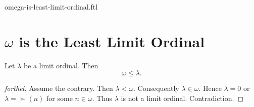 \documentclass{naproche-library}
\begin{document}
\begin{smodule}{omega-is-least-limit-ordinal.ftl}

  \section*{$\omega$ is the Least Limit Ordinal}

  \begin{proposition}[forthel,id=SET_THEORY_03_5517271459954688,printid]
    Let $\lambda$ be a limit ordinal.
    Then \[ \omega \leq \lambda. \]
  \end{proposition}
  \begin{proof}[forthel]
    Assume the contrary.
    Then $\lambda < \omega$.
    Consequently $\lambda \in \omega$.
    Hence $\lambda = 0$ or $\lambda = \succ(n)$ for some $n \in \omega$.
    Thus $\lambda$ is not a limit ordinal.
    Contradiction.
  \end{proof}
\end{smodule}
\end{document}
